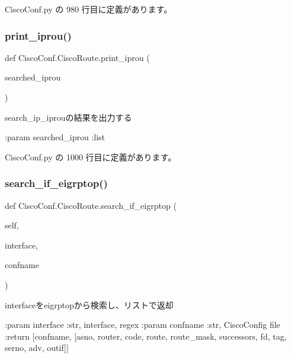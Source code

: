  Cisco\+Conf.\+py の 980 行目に定義があります。

\mbox{\label{classCiscoConf_1_1CiscoRoute_add265b5db1840c18bd24a65d14c0a0bd}} 
\subsubsection{\texorpdfstring{print\_iprou()}{print\_iprou()}}
{\footnotesize\ttfamily def Cisco\+Conf.\+Cisco\+Route.\+print\+\_\+iprou (\begin{DoxyParamCaption}\item[{}]{searched\+\_\+iprou }\end{DoxyParamCaption})\hspace{0.3cm}{\ttfamily [static]}}

\begin{DoxyVerb}search_ip_iprouの結果を出力する

:param searched_iprou :list
\end{DoxyVerb}
 

 Cisco\+Conf.\+py の 1000 行目に定義があります。

\mbox{\label{classCiscoConf_1_1CiscoRoute_ab6b6e674d00d538f497dbca5313297ce}} 
\subsubsection{\texorpdfstring{search\_if\_eigrptop()}{search\_if\_eigrptop()}}
{\footnotesize\ttfamily def Cisco\+Conf.\+Cisco\+Route.\+search\+\_\+if\+\_\+eigrptop (\begin{DoxyParamCaption}\item[{}]{self,  }\item[{}]{interface,  }\item[{}]{confname }\end{DoxyParamCaption})}

\begin{DoxyVerb}interfaceをeigrptopから検索し、リストで返却

:param  interface :str, interface, regex
:param  confname  :str, CiscoConfig file
:return [confname, [asno, router, code, route, route_mask, successors, fd, tag, serno, adv, outif]]
\end{DoxyVerb}
 

